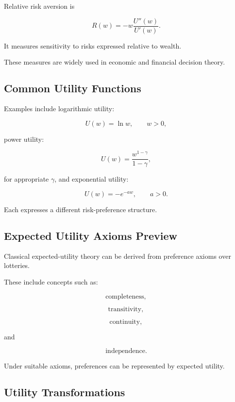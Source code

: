 Relative risk aversion is

\[
\boxed{
R(w)
=
-
w
\frac{
U''(w)
}{
U'(w)
}.
}
\]

It measures sensitivity to risks expressed relative to wealth.

These measures are widely used in economic and financial decision theory.

\subsection{Common Utility Functions}
\label{subsec:common-utility-functions}

Examples include logarithmic utility:

\[
\boxed{
U(w)=\ln w,
\qquad
w>0,
}
\]

power utility:

\[
\boxed{
U(w)
=
\frac{
w^{1-\gamma}
}{
1-\gamma
},
}
\]

for appropriate \(\gamma\), and exponential utility:

\[
\boxed{
U(w)
=
-e^{-aw},
\qquad
a>0.
}
\]

Each expresses a different risk-preference structure.

\subsection{Expected Utility Axioms Preview}
\label{subsec:expected-utility-axioms}

Classical expected-utility theory can be derived from preference axioms
over lotteries.

These include concepts such as:

\[
\boxed{
\text{completeness},
}
\]

\[
\boxed{
\text{transitivity},
}
\]

\[
\boxed{
\text{continuity},
}
\]

and

\[
\boxed{
\text{independence}.
}
\]

Under suitable axioms, preferences can be represented by expected utility.

\subsection{Utility Transformations}
\label{subsec:utility-transformations}

